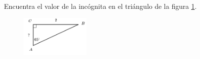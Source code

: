 \question[15]  Encuentra el valor de la incógnita en el triángulo de la figura \ref{fig:lados_functrig_26}.
\begin{figure}[H]
    \begin{center}
        \includegraphics[width=0.3\textwidth]{../images/lados_functrig_26.png}
    \end{center}
    \caption{}
    \label{fig:lados_functrig_26}
\end{figure}